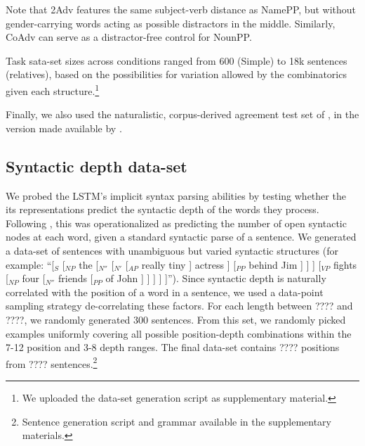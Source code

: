  Note that 2Adv features the same subject-verb
distance as NamePP, but without gender-carrying words acting as
possible distractors in the middle. Similarly, CoAdv can serve as a
distractor-free control for NounPP.

Task sata-set sizes across conditions ranged from 600 (Simple) to 18k sentences (relatives),
based on the possibilities for variation allowed by the combinatorics
given each structure.\footnote{We uploaded the data-set generation
  script as supplementary material.}

Finally, we also used the naturalistic, corpus-derived agreement test set of , in the version made available by .

\subsection{Syntactic depth data-set}\label{ssec:n_opennodes}

We probed the LSTM's implicit syntax parsing abilities by testing
whether the its representations predict the syntactic depth of the
words they process. Following , this was
operationalized as predicting the number of open syntactic nodes at
each word, given a standard syntactic parse of a sentence.  We
generated a data-set of sentences with unambiguous but varied
syntactic structures (for example: ``[$_S$ [$_{NP}$ the [$_{N''}$ [$_{N'}$ [$_{AP}$ really tiny ]  actress  ] [$_{PP}$ behind  Jim  ] ] ] [$_{VP}$ fights [$_{NP}$ four [$_{N''}$ friends [$_{PP}$ of  John ] ] ] ] ]''). Since syntactic depth is naturally correlated with
the position of a word in a sentence, we used a data-point sampling
strategy de-correlating these factors. For each length between ????
and ????, we randomly generated 300 sentences. From this set, we
randomly picked examples uniformly covering all possible
position-depth combinations within the 7-12 position and 3-8
depth ranges.  The final data-set contains ???? positions
from ???? sentences.\footnote{Sentence generation script and grammar
  available in the supplementary materials.}


